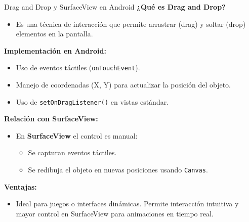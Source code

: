 \begin{frame}[fragile]{Drag and Drop y SurfaceView en Android}
\textbf{¿Qué es Drag and Drop?}

\begin{itemize}
    \item Es una técnica de interacción que permite arrastrar (drag) y soltar (drop) elementos en la pantalla.
\end{itemize}

\textbf{Implementación en Android:}
\begin{itemize}
    \item Uso de eventos táctiles (\texttt{onTouchEvent}).
    \item Manejo de coordenadas (X, Y) para actualizar la posición del objeto.
    \item Uso de \texttt{setOnDragListener()} en vistas estándar.
\end{itemize}

\vspace{0.3cm}

\textbf{Relación con SurfaceView:}
\begin{itemize}
    \item En \textbf{SurfaceView} el control es manual:
    \begin{itemize}
        \item Se capturan eventos táctiles.
        \item Se redibuja el objeto en nuevas posiciones usando \texttt{Canvas}.
    \end{itemize}
\end{itemize}


\textbf{Ventajas:}
\begin{itemize}
    \item Ideal para juegos o interfaces dinámicas. Permite interacción intuitiva y mayor control en SurfaceView para animaciones en tiempo real.
\end{itemize}

\end{frame}




